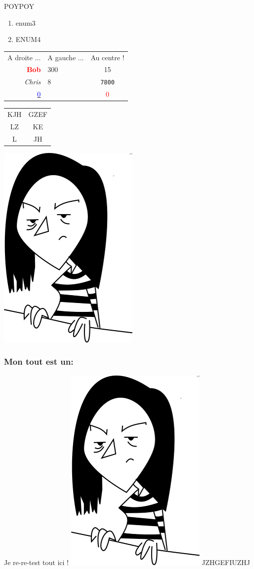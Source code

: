 \documentclass[10pt,a4paper]{report}
\begin{document}
POYPOY
\begin{enumerate}
\item enum3
\item ENUM4
\end{enumerate}
\begin{tabular}{rlc}
A droite ... & A gauche ... & Au centre ! \\
{\bf \textcolor{red}{Bob}} & 300 & 15 \\
{\itshape Chris} & 8 & \texttt{7800} \\
\underline{ \textcolor{blue}{0}} & \textcolor{white}{h} & \textcolor{red}{0} \\
\end{tabular}

\begin{tabular}{cc}
KJH & GZEF  \\
LZ & KE\\
L & JH\\
\end{tabular}

\includegraphics{Mini_Amel.png}

\subsubsection{Mon tout est un:}
Je re-re-test tout ici !
\includegraphics{Mini_Amel.png}
JZHGEFIUZHJ
\end{document}

